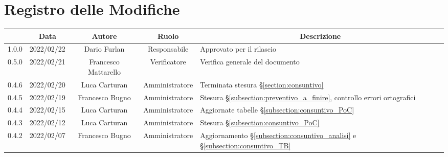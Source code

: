 \thispagestyle{empty}
\section*{Registro delle Modifiche}

\begin{center}
	\renewcommand{\arraystretch}{1.8}
	\begin{longtable}[c]{c | c | c | c | p{5cm}}
		\rowcolor[HTML]{125E28}
		\multicolumn{1}{c}{\color[HTML]{FFFFFF} \textbf{Versione}} &
		\multicolumn{1}{c}{\color[HTML]{FFFFFF} \textbf{Data}}     &
		\multicolumn{1}{c}{\color[HTML]{FFFFFF} \textbf{Autore}}   &
		\multicolumn{1}{c}{\color[HTML]{FFFFFF} \textbf{Ruolo}}    &
		\multicolumn{1}{c}{\color[HTML]{FFFFFF} \textbf{Descrizione}}                                                                                                                                                                                               \\
		\endhead

		1.0.0& 2022/02/22 & Dario Furlan & Responsabile & Approvato per il rilascio \\
		0.5.0& 2022/02/21 & Francesco Mattarello & Verificatore   & Verifica generale del documento \\
		0.4.6 & 2022/02/20 & Luca Carturan & Amministratore & Terminata stesura §\ref{section:consuntivo}\\
		0.4.5 & 2022/02/19 & Francesco Bugno & Amministratore & Stesura §\ref{subsection:preventivo_a_finire}, controllo errori ortografici \\
		0.4.4 & 2022/02/15 & Luca Carturan & Amministratore & Aggiornate tabelle §\ref{subsection:consuntivo_PoC} \\
		0.4.3 & 2022/02/12 & Luca Carturan & Amministratore & Stesura §\ref{subsection:consuntivo_PoC} \\
		0.4.2 & 2022/02/07 & Francesco Bugno & Amministratore & Aggiornamento §\ref{subsection:consuntivo_analisi} e §\ref{subsection:consuntivo_TB} \\
		

\end{longtable}
\end{center}
